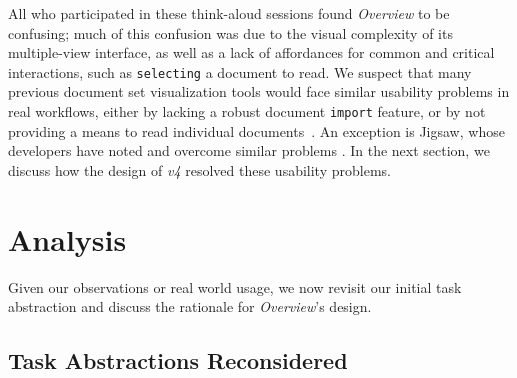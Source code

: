 All who participated in these think-aloud sessions found {\it Overview} to be confusing; much of this confusion was due to the visual complexity of its multiple-view interface, as well as a lack of affordances for common and critical interactions, such as {\tt selecting} a document to read. 
We suspect that many previous document set visualization tools would face similar usability problems in real workflows, either by lacking a robust document {\tt import} feature, or by not providing a means to read individual documents~\cite{Cui2011}.
An exception is Jigsaw, whose developers have noted and overcome similar problems \cite{Gorg2014}.
In the next section, we discuss how the design of {\it v4} resolved these usability problems.


\section{Analysis}
\label{overview:analysis}


Given our observations or real world usage, we now revisit our initial task abstraction and discuss the rationale for {\it Overview}'s design.


\subsection{Task Abstractions Reconsidered}
\label{overview:task-abstraction-reconsidered}




